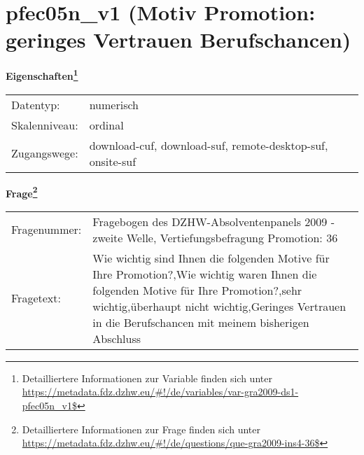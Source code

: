 
    \setcounter{footnote}{0}

    \vspace*{-1.8cm}
	\section{pfec05n\_v1 (Motiv Promotion: geringes Vertrauen Berufschancen)}
	\label{section:pfec05n_v1}



    \vspace*{0.5cm}
    \noindent\textbf{Eigenschaften\footnote{Detailliertere Informationen zur Variable finden sich unter
		\url{https://metadata.fdz.dzhw.eu/\#!/de/variables/var-gra2009-ds1-pfec05n_v1$}}}\\
	\begin{tabularx}{\hsize}{@{}lX}
	Datentyp: & numerisch \\
	Skalenniveau: & ordinal \\
	Zugangswege: &
	  download-cuf, 
	  download-suf, 
	  remote-desktop-suf, 
	  onsite-suf
 \\
    \end{tabularx}



				\vspace*{0.5cm}
                \noindent\textbf{Frage\footnote{Detailliertere Informationen zur Frage finden sich unter
		              \url{https://metadata.fdz.dzhw.eu/\#!/de/questions/que-gra2009-ins4-36$}}}\\
				\begin{tabularx}{\hsize}{@{}lX}
					Fragenummer: &
					  Fragebogen des DZHW-Absolventenpanels 2009 - zweite Welle, Vertiefungsbefragung Promotion:
					  36
 \\
					Fragetext: & Wie wichtig sind Ihnen die folgenden Motive für Ihre Promotion?,Wie wichtig waren Ihnen die folgenden Motive für Ihre Promotion?,sehr wichtig,überhaupt nicht wichtig,Geringes Vertrauen in die Berufschancen mit meinem bisherigen Abschluss \\
				\end{tabularx}





